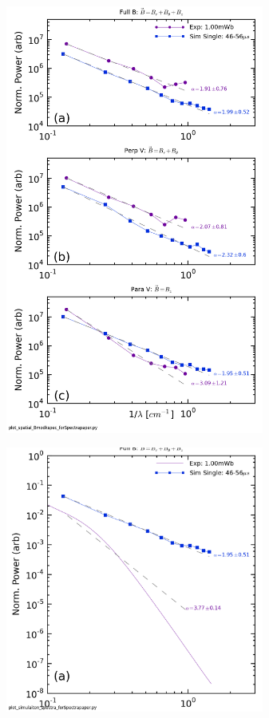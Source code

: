 \documentclass[aip,prl,amsmath,amssymb,reprint,superscriptaddress]{revtex4-1} %
\begin{document}
\begin{figure}[!htbp]
\centerline{
\includegraphics[width=8.5cm]{Bmod_FFTwavenumberspectra_wFits_40t60us_simulationcomparison}}
\caption{\label{fig:sim_wavenumber_comp}}
\end{figure}

\begin{figure}[!htbp]
\centerline{
\includegraphics[width=8.5cm]{Simulation_spatial_temporal_spectra_comparision}}
\caption{\label{fig:sim_spatial_comp}}
\end{figure}
\end{document}
